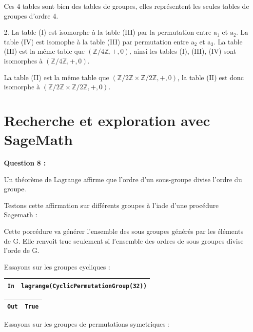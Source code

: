 \documentclass[titlepage]{article}
\begin{document}
    Ces 4 tables sont bien des tables de groupes, elles représentent les seules tables de groupes d'ordre 4.\newline

    2. La table (I) est isomorphe à la table (III) par la permutation entre $\textrm{a}_\textrm{1}$ et $\textrm{a}_\textrm{2}$. 
    La table (IV) est isomophe à la table (III) par permutation entre $\textrm{a}_\textrm{2}$ et $\textrm{a}_\textrm{3}$.
    La table (III) est la même table que $(\mathbb{Z}/4\mathbb{Z}, +, 0)$, ainsi les tables (I), (III), (IV) sont isomorphes à $(\mathbb{Z}/4\mathbb{Z}, +, 0)$.\newline

    La table (II) est la même table que $(\mathbb{Z}/2\mathbb{Z} \times \mathbb{Z}/2\mathbb{Z}, +, 0)$, la table (II) est donc isomorphe à $(\mathbb{Z}/2\mathbb{Z} \times \mathbb{Z}/2\mathbb{Z}, +, 0)$.
    \section{Recherche et exploration avec SageMath}
    \textbf{Question 8 :}

    Un théorème de Lagrange affirme que l’ordre d’un sous-groupe divise l’ordre du groupe.

    Testons cette affirmation sur différents groupes à l'iade d'une procédure Sagemath : 

    

    Cette porcédure va générer l'ensemble des sous groupes générés par les éléments de G.
    Elle renvoit true seulement si l'ensemble des ordres de sous groupes divise l'orde de G.

    Essayons sur les groupes cycliques :

    \begin{tabularx}{11.5cm}{|p{0.60cm}|X|}
        \hline
        \verb|In|
        & 
        \verb|lagrange(CyclicPermutationGroup(32))|
        \\
        \hline
    \end{tabularx}\newline
    \begin{tabularx}{11.5cm}{|p{0.60cm}|X|}
        \hline
        \verb|Out|
        & 
        \verb|True|
        \\
        \hline
    \end{tabularx}\newline

    Essayons sur les groupes de permutations symetriques : 
\end{document}
